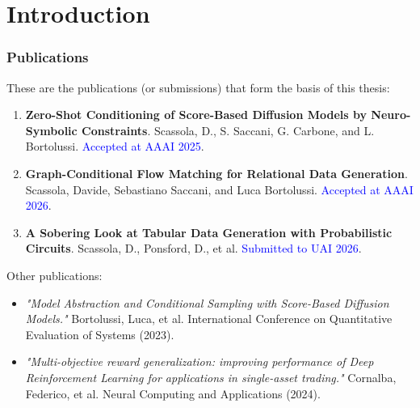 \section{Introduction}

\begin{frame}

\frametitle{Publications}


These are the publications (or submissions) that form the basis of this thesis:
\begin{enumerate}
    
    

    \item \textbf{Zero-Shot Conditioning of Score-Based Diffusion Models by Neuro-Symbolic Constraints}. Scassola, D., S. Saccani, G. Carbone, and L. Bortolussi. \textcolor{blue}{Accepted at AAAI 2025}.
    
    \item \textbf{Graph-Conditional Flow Matching for Relational Data Generation}. Scassola, Davide, Sebastiano Saccani, and Luca Bortolussi. \textcolor{blue}{Accepted at AAAI 2026}.    
    
    \item \textbf{A Sobering Look at Tabular Data Generation with Probabilistic Circuits}. Scassola, D., Ponsford, D., et al. \textcolor{blue}{Submitted to UAI 2026}.
    
\end{enumerate}

Other publications:
\small
\begin{itemize}
    \item \textit{"Model Abstraction and Conditional Sampling with Score-Based Diffusion Models."} Bortolussi, Luca, et al. International Conference on Quantitative Evaluation of Systems (2023).
    \item \textit{"Multi-objective reward generalization: improving performance of Deep Reinforcement Learning for applications in single-asset trading."} Cornalba, Federico, et al. Neural Computing and Applications (2024).
\end{itemize}



\end{frame}
